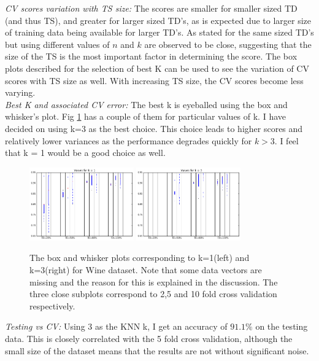 \documentclass[5pt]{article}
\begin{document}
\noindent \emph{CV scores variation with TS size:}
The scores are smaller for smaller sized TD (and thus TS), and greater for
larger sized TD's, as is expected due to larger size of training data being
available for larger TD's. As stated for the same sized TD's but using
different values of $n$ and $k$ are observed to be close, suggesting that the
size of the TS is the most important factor in determining the score. The box
plots described for the selection of best K can be used to see the variation of
CV scores with TS size as well. With increasing TS size, the CV scores become
less varying.\\

\noindent \emph{Best K and associated CV error:}
The best k is eyeballed using the box and whisker's plot. Fig
\ref{fig:boxplotsWine} has a couple of them for particular values of k. I have
decided on using k=3 as the best choice. This choice leads to higher scores and
relatively lower variances as the performance degrades quickly for $k > 3$. I
feel that k = 1 would be a good choice as well.\\

\begin{figure}[h]
  \center{}
  \includegraphics[width=0.4\textwidth]{images/wineBoxK1.png}
  \includegraphics[width=0.4\textwidth]{images/wineBoxK2.png}
  \caption{The box and whisker plots corresponding to k=1(left) and k=3(right)
    for Wine dataset. Note that some data vectors are missing and the reason
    for this is explained in the discussion. The three close subplots
  correspond to 2,5 and 10 fold cross validation respectively.}
\label{fig:boxplotsWine}
\end{figure}

\noindent \emph{Testing vs CV:}
Using 3 as the KNN k, I get an accuracy of $91.1\%$ on the testing data. This
is closely correlated with the 5 fold cross validation, although the small
size of the dataset means that the results are not without significant noise.
\end{document}
